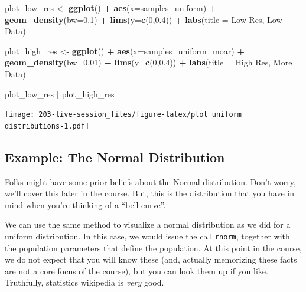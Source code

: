 \documentclass[
]{book}
\newenvironment{Shaded}{\begin{snugshade}}{\end{snugshade}}
\newcommand{\AttributeTok}[1]{\textcolor[rgb]{0.13,0.29,0.53}{#1}}
\newcommand{\DecValTok}[1]{\textcolor[rgb]{0.00,0.00,0.81}{#1}}
\newcommand{\FloatTok}[1]{\textcolor[rgb]{0.00,0.00,0.81}{#1}}
\newcommand{\FunctionTok}[1]{\textcolor[rgb]{0.13,0.29,0.53}{\textbf{#1}}}
\newcommand{\NormalTok}[1]{#1}
\newcommand{\OtherTok}[1]{\textcolor[rgb]{0.56,0.35,0.01}{#1}}
\newcommand{\SpecialCharTok}[1]{\textcolor[rgb]{0.81,0.36,0.00}{\textbf{#1}}}
\newcommand{\StringTok}[1]{\textcolor[rgb]{0.31,0.60,0.02}{#1}}
\theoremstyle{definition}
\theoremstyle{definition}
\theoremstyle{definition}
\theoremstyle{definition}
\theoremstyle{remark}
\begin{document}
\begin{Shaded}
\begin{Highlighting}[]
\NormalTok{plot\_low\_res }\OtherTok{\textless{}{-}} \FunctionTok{ggplot}\NormalTok{()  }\SpecialCharTok{+} 
  \FunctionTok{aes}\NormalTok{(}\AttributeTok{x=}\NormalTok{samples\_uniform)  }\SpecialCharTok{+} 
  \FunctionTok{geom\_density}\NormalTok{(}\AttributeTok{bw=}\FloatTok{0.1}\NormalTok{)    }\SpecialCharTok{+} 
  \FunctionTok{lims}\NormalTok{(}\AttributeTok{y=}\FunctionTok{c}\NormalTok{(}\DecValTok{0}\NormalTok{,}\FloatTok{0.4}\NormalTok{))        }\SpecialCharTok{+} 
  \FunctionTok{labs}\NormalTok{(}\AttributeTok{title =} \StringTok{\textquotesingle{}Low Res, Low Data\textquotesingle{}}\NormalTok{)}

\NormalTok{plot\_high\_res }\OtherTok{\textless{}{-}} \FunctionTok{ggplot}\NormalTok{()     }\SpecialCharTok{+} 
  \FunctionTok{aes}\NormalTok{(}\AttributeTok{x=}\NormalTok{samples\_uniform\_moar) }\SpecialCharTok{+} 
  \FunctionTok{geom\_density}\NormalTok{(}\AttributeTok{bw=}\FloatTok{0.01}\NormalTok{)       }\SpecialCharTok{+} 
  \FunctionTok{lims}\NormalTok{(}\AttributeTok{y=}\FunctionTok{c}\NormalTok{(}\DecValTok{0}\NormalTok{,}\FloatTok{0.4}\NormalTok{))            }\SpecialCharTok{+} 
  \FunctionTok{labs}\NormalTok{(}\AttributeTok{title =} \StringTok{\textquotesingle{}High Res, More Data\textquotesingle{}}\NormalTok{)}

\NormalTok{plot\_low\_res }\SpecialCharTok{|}\NormalTok{ plot\_high\_res}
\end{Highlighting}
\end{Shaded}

\texttt{[image: 203-live-session\_files/figure-latex/plot uniform distributions-1.pdf]}

\hypertarget{example-the-normal-distribution}{%
\subsection{Example: The Normal Distribution}\label{example-the-normal-distribution}}

Folks might have some prior beliefs about the Normal distribution. Don't worry, we'll cover this later in the course. But, this is the distribution that you have in mind when you're thinking of a ``bell curve''.

We can use the same method to visualize a normal distribution as we did for a uniform distribution. In this case, we would issue the call \texttt{rnorm}, together with the population parameters that define the population. At this point in the course, we do not expect that you will know these (and, actually memorizing these facts are not a core focus of the course), but you can \href{https://en.wikipedia.org/wiki/Normal_distribution}{look them up} if you like. Truthfully, statistics wikipedia is \emph{very} good.
\end{document}
